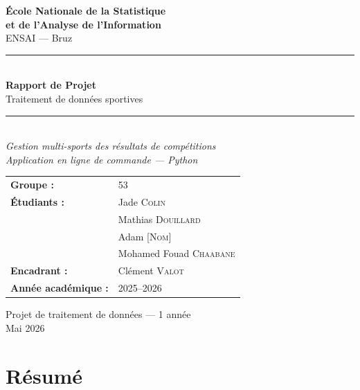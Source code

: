 \documentclass[12pt,a4paper]{article}
\begin{document}
\begin{titlepage}
  \centering
  \vspace*{1.5cm}

  {\LARGE\bfseries École Nationale de la Statistique\\
  et de l'Analyse de l'Information}\\[0.3cm]
  {\large ENSAI --- Bruz}\\[1.5cm]

  \rule{\linewidth}{1.5pt}\\[0.4cm]
  {\Huge\bfseries Rapport de Projet}\\[0.3cm]
  {\LARGE Traitement de données sportives}\\[0.2cm]
  \rule{\linewidth}{1.5pt}\\[1.2cm]

  {\large\itshape Gestion multi-sports des résultats de compétitions\\
  Application en ligne de commande --- Python}\\[2cm]

  \begin{tabular}{ll}
    \textbf{Groupe :} & 53 \\[0.3cm]
    \textbf{Étudiants :} & Jade \textsc{Colin} \\
                         & Mathias \textsc{Douillard} \\
                         & Adam \textsc{[Nom]} \\
                         & Mohamed Fouad \textsc{Chaabane} \\[0.3cm]
    \textbf{Encadrant :} & Clément \textsc{Valot} \\[0.3cm]
    \textbf{Année académique :} & 2025--2026 \\
  \end{tabular}

  \vfill

  {\small Projet de traitement de données --- 1\iere{} année\\
  Mai 2026}
\end{titlepage}

\thispagestyle{empty}
\section*{Résumé}
\end{document}

